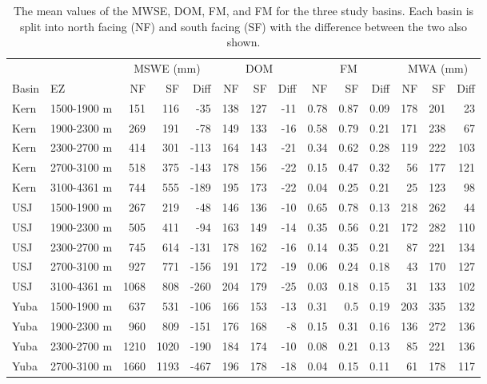 \clearpage
\begin{table}[htbp]
\centering
\caption{The mean values of the MWSE, DOM, FM, and FM for the three study basins. Each basin is split into north facing (NF) and south facing (SF) with the difference between the two also shown.}
\label{tab:snow_metric_table}
\tiny %
\begin{tabular}{llrrrrrrrrrrrr}
\toprule
& & \multicolumn{3}{c}{MSWE (mm)} & \multicolumn{3}{c}{DOM} & \multicolumn{3}{c}{FM} & \multicolumn{3}{c}{MWA (mm)} \\
\cmidrule(c){3-5} \cmidrule(lr){6-8} \cmidrule(lr){9-11} \cmidrule(lr){12-14} 
Basin & EZ & NF & SF & Diff & NF & SF & Diff & NF & SF & Diff & NF & SF & Diff \\
\midrule
Kern & 1500-1900 m & 151 & 116 & -35 & 138 & 127 & -11 & 0.78 & 0.87 & 0.09 & 178 & 201 & 23 \\
Kern & 1900-2300 m & 269 & 191 & -78 & 149 & 133 & -16 & 0.58 & 0.79 & 0.21 & 171 & 238 & 67 \\
Kern & 2300-2700 m & 414 & 301 & -113 & 164 & 143 & -21 & 0.34 & 0.62 & 0.28 & 119 & 222 & 103 \\
Kern & 2700-3100 m & 518 & 375 & -143 & 178 & 156 & -22 & 0.15 & 0.47 & 0.32 & 56 & 177 & 121 \\
Kern & 3100-4361 m & 744 & 555 & -189 & 195 & 173 & -22 & 0.04 & 0.25 & 0.21 & 25 & 123 & 98 \\
USJ & 1500-1900 m & 267 & 219 & -48 & 146 & 136 & -10 & 0.65 & 0.78 & 0.13 & 218 & 262 & 44 \\
USJ & 1900-2300 m & 505 & 411 & -94 & 163 & 149 & -14 & 0.35 & 0.56 & 0.21 & 172 & 282 & 110 \\
USJ & 2300-2700 m & 745 & 614 & -131 & 178 & 162 & -16 & 0.14 & 0.35 & 0.21 & 87 & 221 & 134 \\
USJ & 2700-3100 m & 927 & 771 & -156 & 191 & 172 & -19 & 0.06 & 0.24 & 0.18 & 43 & 170 & 127 \\
USJ & 3100-4361 m & 1068 & 808 & -260 & 204 & 179 & -25 & 0.03 & 0.18 & 0.15 & 31 & 133 & 102 \\
Yuba & 1500-1900 m & 637 & 531 & -106 & 166 & 153 & -13 & 0.31 & 0.5 & 0.19 & 203 & 335 & 132 \\
Yuba & 1900-2300 m & 960 & 809 & -151 & 176 & 168 & -8 & 0.15 & 0.31 & 0.16 & 136 & 272 & 136 \\
Yuba & 2300-2700 m & 1210 & 1020 & -190 & 184 & 174 & -10 & 0.08 & 0.21 & 0.13 & 85 & 221 & 136 \\
Yuba & 2700-3100 m & 1660 & 1193 & -467 & 196 & 178 & -18 & 0.04 & 0.15 & 0.11 & 61 & 178 & 117 \\
\bottomrule
\end{tabular}
\end{table}


